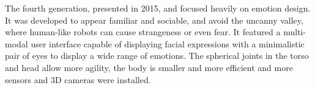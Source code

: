 The fourth generation, presented in 2015, and focused heavily on emotion design. It was developed to appear familiar and sociable, and avoid the uncanny valley, where human-like robots can cause strangeness or even fear. It featured a multi-modal user interface capable of displaying facial expressions with a minimalistic pair of eyes to display a wide range of emotions. The spherical joints in the torso and head allow more agility, the body is smaller and more efficient and more sensors and 3D cameras were installed.












